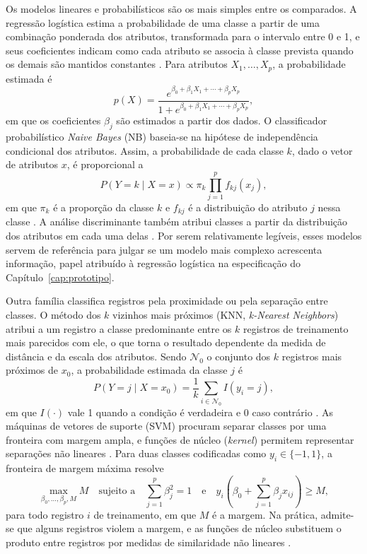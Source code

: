 Os modelos lineares e probabilísticos são os mais simples entre os comparados. A regressão logística estima a probabilidade de uma classe a partir de uma combinação ponderada dos atributos, transformada para o intervalo entre 0 e 1, e seus coeficientes indicam como cada atributo se associa à classe prevista quando os demais são mantidos constantes \cite{James2021}. Para atributos $X_1, \ldots, X_p$, a probabilidade estimada é
\begin{equation}
p(X) = \frac{e^{\beta_0 + \beta_1 X_1 + \cdots + \beta_p X_p}}{1 + e^{\beta_0 + \beta_1 X_1 + \cdots + \beta_p X_p}},
\label{eq:logistica}
\end{equation}
em que os coeficientes $\beta_j$ são estimados a partir dos dados. O classificador probabilístico \textit{Naive Bayes} (NB) baseia-se na hipótese de independência condicional dos atributos. Assim, a probabilidade de cada classe $k$, dado o vetor de atributos $x$, é proporcional a
\begin{equation}
P(Y = k \mid X = x) \propto \pi_k \prod_{j=1}^{p} f_{kj}(x_j),
\label{eq:naive-bayes}
\end{equation}
em que $\pi_k$ é a proporção da classe $k$ e $f_{kj}$ é a distribuição do atributo $j$ nessa classe \cite{James2021}. A análise discriminante também atribui classes a partir da distribuição dos atributos em cada uma delas \cite{James2021}. Por serem relativamente legíveis, esses modelos servem de referência para julgar se um modelo mais complexo acrescenta informação, papel atribuído à regressão logística na especificação do Capítulo~\ref{cap:prototipo}.

Outra família classifica registros pela proximidade ou pela separação entre classes. O método dos $k$ vizinhos mais próximos (KNN, \textit{k-Nearest Neighbors}) atribui a um registro a classe predominante entre os $k$ registros de treinamento mais parecidos com ele, o que torna o resultado dependente da medida de distância e da escala dos atributos. Sendo $\mathcal{N}_0$ o conjunto dos $k$ registros mais próximos de $x_0$, a probabilidade estimada da classe $j$ é
\begin{equation}
P(Y = j \mid X = x_0) = \frac{1}{k} \sum_{i \in \mathcal{N}_0} I(y_i = j),
\label{eq:knn}
\end{equation}
em que $I(\cdot)$ vale 1 quando a condição é verdadeira e 0 caso contrário \cite{James2021}. As máquinas de vetores de suporte (SVM) procuram separar classes por uma fronteira com margem ampla, e funções de núcleo (\textit{kernel}) permitem representar separações não lineares \cite{CortesVapnik1995}. Para duas classes codificadas como $y_i \in \{-1, 1\}$, a fronteira de margem máxima resolve
\begin{equation}
\max_{\beta_0, \ldots, \beta_p, M} M \quad \text{sujeito a} \quad \sum_{j=1}^{p} \beta_j^2 = 1 \quad \text{e} \quad y_i\left(\beta_0 + \sum_{j=1}^{p} \beta_j x_{ij}\right) \geq M,
\label{eq:svm}
\end{equation}
para todo registro $i$ de treinamento, em que $M$ é a margem. Na prática, admite-se que alguns registros violem a margem, e as funções de núcleo substituem o produto entre registros por medidas de similaridade não lineares \cite{James2021}.

